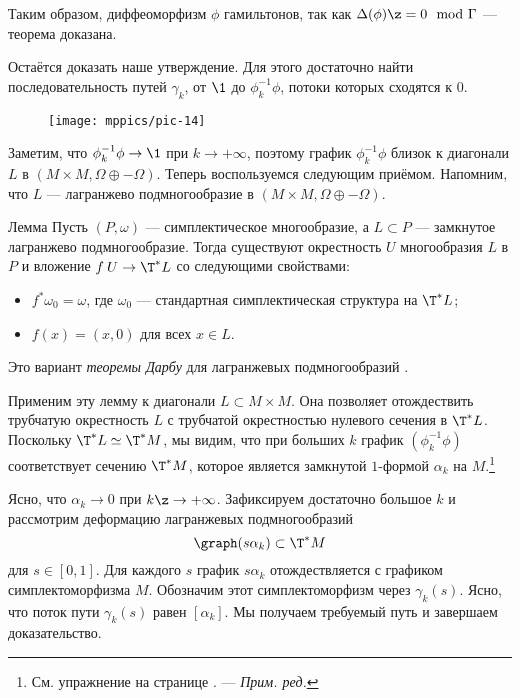 Таким образом, диффеоморфизм $\phi$ гамильтонов, так как $\Delta(\phi) \z= 0 \mod{\Gamma}$  --- теорема доказана.

Остаётся доказать наше утверждение.
Для этого достаточно найти последовательность путей $\gamma_k$, от $\1$ до $\phi_k^{-1}\phi$, потоки которых сходятся к $0$.

\begin{figure}[ht!]
\centering
\texttt{[image: mppics/pic-14]}
\caption{}\label{pic-14}
\vskip0mm
\end{figure}

Заметим, что $\phi_k^{-1}\phi \to \1$ при $k \to +\infty$, поэтому график $\phi_k^{-1}\phi$ близок к диагонали $L$ в $(M \times M, \Omega \oplus -\Omega)$.
Теперь воспользуемся следующим приёмом.
Напомним, что $L$ --- лагранжево подмногообразие в $(M \times M, \Omega \oplus -\Omega)$.

\begin{thm}{Лемма}
Пусть $(P, \omega)$ --- симплектическое многообразие, а $L\subset P$ --- замкнутое лагранжево подмногообразие.
Тогда существуют окрестность $U$ многообразия $L$ в $P$ и вложение $f\: U \to \T^\ast L$ со следующими свойствами:
\begin{itemize}
\item $f^\ast\omega_0 = \omega$, где $\omega_0$ --- стандартная симплектическая структура на $\T^\ast L$;
\item $f(x) = (x,0)$ для всех $x\in L$.
\end{itemize}
\end{thm}
Это вариант \emph{теоремы Дарбу} для лагранжевых подмногообразий \cite{MS}.

Применим эту лемму к диагонали $L \subset M \times M$.
Она позволяет отождествить трубчатую окрестность $L$ с трубчатой окрестностью нулевого сечения в $\T^\ast L$.
Поскольку $\T^\ast L \simeq \T^\ast M$, мы видим, что при больших $k$ график $(\phi_k^{-1}\phi)$ соответствует сечению $\T^\ast M$, которое является замкнутой $1$-формой $\alpha_k$ на $M$.\footnote{См. упражнение на странице \pageref{1-form-lagrange}. --- \textit{Прим. ред.}}

Ясно, что $\alpha_k \to 0$ при $k\z\to +\infty$.
Зафиксируем достаточно большое $k$ и рассмотрим деформацию лагранжевых подмногообразий 
\[\graph (s\alpha_k) \subset \T^\ast M\]
для $s \in [0,1]$.
Для каждого $s$ график $s\alpha_k$ отождествляется с графиком симплектоморфизма $M$.
Обозначим этот симплектоморфизм через $\gamma_k(s)$.
Ясно, что поток пути $\gamma_k(s)$ равен $[\alpha_k]$.
Мы получаем требуемый путь и завершаем доказательство.
\qeds

